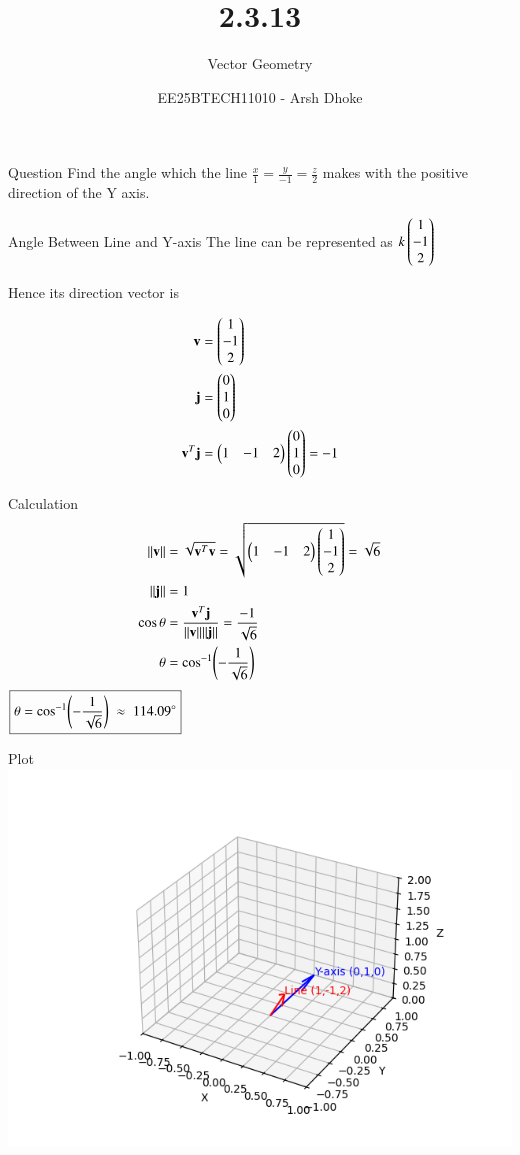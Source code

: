 \documentclass{beamer}
\title{2.3.13}
\subtitle{Vector Geometry}
\author{EE25BTECH11010 - Arsh Dhoke}
\date{}
\begin{document}
\begin{frame}
\titlepage
\end{frame}

\begin{frame}{Question}
Find the angle which the line $\frac{x}{1}=\frac{y}{-1}=\frac{z}{2}$ makes with the positive direction of the Y axis.
\end{frame}

\begin{frame}{Angle Between Line and Y-axis}
The line can be represented as 
$
k \begin{pmatrix}1\\-1\\2\end{pmatrix}
$

Hence its direction vector is

\begin{align}
\mathbf{v} &= \begin{pmatrix}1\\-1\\2\end{pmatrix} \\
\mathbf{j} &= \begin{pmatrix}0\\1\\0\end{pmatrix} \\
\mathbf{v}^T\mathbf{j} &= 
\begin{pmatrix}1 & -1 & 2\end{pmatrix}\begin{pmatrix}0\\1\\0\end{pmatrix}=-1 
\end{align}
\end{frame}

\begin{frame}{Calculation}
\begin{align}
\|\mathbf{v}\| &= 
\sqrt{\mathbf{v}^T\mathbf{v}}
=\sqrt{\begin{pmatrix}1 & -1 & 2\end{pmatrix}\begin{pmatrix}1\\-1\\2\end{pmatrix}}=\sqrt{6} \\
\|\mathbf{j}\| &=1 \\
\cos\theta &= 
\frac{\mathbf{v}^T\mathbf{j}}{\|\mathbf{v}\|\|\mathbf{j}\|}
=\frac{-1}{\sqrt{6}} \\
\theta &= \cos^{-1}\!\left(-\frac{1}{\sqrt{6}}\right)
\end{align}
$
\boxed{\theta=\cos^{-1}\!\left(-\frac{1}{\sqrt{6}}\right)\;\approx\;114.09\degree}
$
\end{frame}

\begin{frame}{Plot}
\centering
\includegraphics[height=0.6\textheight, keepaspectratio]{figs/q3.png}
\end{frame}
\end{document}
